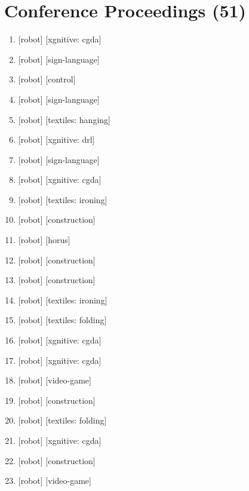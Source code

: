 \documentclass{article}
\begin{document}
\section*{Conference Proceedings (51)}
\begin{enumerate}
  \item {} [robot] [xgnitive: cgda]
  \item {} [robot] [sign-language]
  \item {} [robot] [control]
  \item {} [robot] [sign-language]
  \item {} [robot] [textiles: hanging]
  \item {} [robot] [xgnitive: drl]
  \item {} [robot] [sign-language]
  \item {} [robot] [xgnitive: cgda]
  \item {} [robot] [textiles: ironing]
  \item {} [robot] [construction]
  \item {} [robot] [horus]
  \item {} [robot] [construction]
  \item {} [robot] [construction]
  \item {} [robot] [textiles: ironing]
  \item {} [robot] [textiles: folding]
  \item {} [robot] [xgnitive: cgda]
  \item {} [robot] [xgnitive: cgda]
  \item {} [robot] [video-game]
  \item {} [robot] [construction]
  \item {} [robot] [textiles: folding]
  \item {} [robot] [xgnitive: cgda]
  \item {} [robot] [construction]
  \item {} [robot] [video-game]

\end{enumerate}
\end{document}
